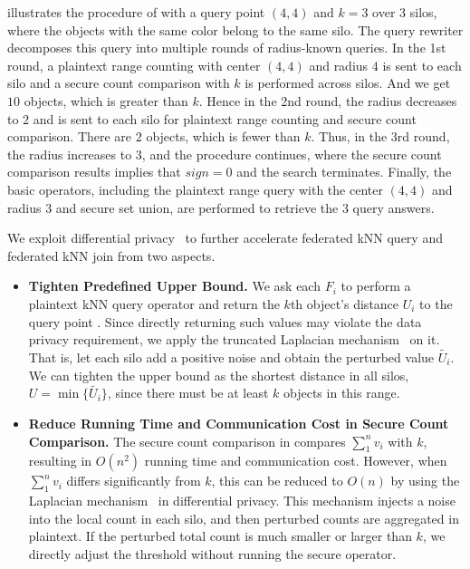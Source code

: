 \begin{example}
 illustrates the procedure of  with a query point $(4,4)$ and $k = 3$ over 3 silos,
where the objects with the same color belong to the same silo.
The query rewriter decomposes this query into multiple rounds of radius-known queries.
In the 1st round, a plaintext range counting with center $(4,4)$ and radius $4$ is sent to each silo and a secure count comparison with $k$ is performed across silos.
And we get $10$ objects, which is greater than $k$.
Hence in the 2nd round, the radius decreases to $2$ and is sent to each silo for plaintext range counting and secure count comparison.
There are $2$ objects, which is fewer than $k$.
Thus, in the 3rd round, the radius increases to $3$, and the procedure continues, where the secure count comparison results implies that $sign = 0$ and the search terminates.
Finally, the basic operators, including the plaintext range query with the center $(4,4)$ and radius $3$ and secure set union, are performed to retrieve the 3 query answers.
\end{example}

We exploit differential privacy~\cite{DBLP:series/synthesis/2016Li} to further accelerate federated kNN query and federated kNN join from two aspects.
\begin{itemize}
    \item \textbf{Tighten Predefined Upper Bound.}
    We ask each $F_i$ to perform a plaintext kNN query operator and return the $k$th object's distance $U_i$ to the query point .
    Since directly returning such values may violate the data privacy requirement, we apply the truncated Laplacian mechanism~\cite{DBLP:journals/pvldb/BaterHEMR18} on it.
    That is, let each silo add a positive noise and obtain the perturbed value $\tilde{U_i}$.
    We can tighten the upper bound as the shortest distance in all silos, \ie $U = \min\{\tilde{U_i}\}$, since there must be at least $k$ objects in this range.

    \item \textbf{Reduce Running Time and Communication Cost in Secure Count Comparison.}
    The secure count comparison in  compares $\sum_1^n{v_i}$ with $k$, resulting in $O(n^2)$ running time and communication cost.
    However, when $\sum_1^n{v_i}$ differs significantly from $k$, this can be reduced to $O(n)$ by using the Laplacian mechanism~\cite{DBLP:series/synthesis/2016Li} in differential privacy.
    This mechanism injects a noise into the local count in each silo, and then perturbed counts are aggregated in plaintext.
    If the perturbed total count is much smaller or larger than $k$, we directly adjust the threshold without running the secure operator.
\end{itemize}

